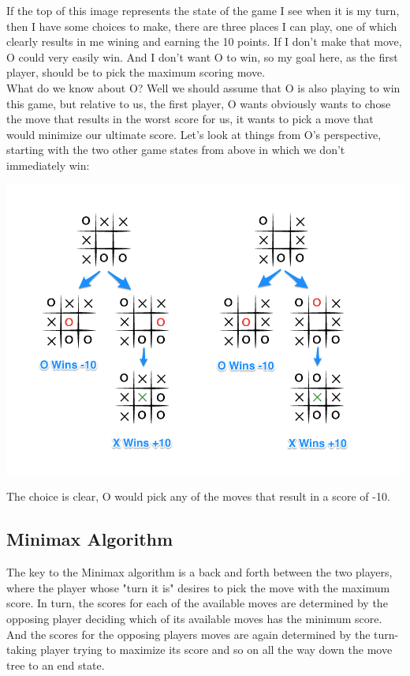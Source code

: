 If the top of this image represents the state of the game I see when it is my turn, then I have some choices to make, there are three places I can play, one of which clearly results in me wining and earning the 10 points. If I don't make that move, O could very easily win. And I don't want O to win, so my goal here, as the first player, should be to pick the maximum scoring move. \\

What do we know about O? Well we should assume that O is also playing to win this game, but relative to us, the first player, O wants obviously wants to chose the move that results in the worst score for us, it wants to pick a move that would minimize our ultimate score. Let's look at things from O's perspective, starting with the two other game states from above in which we don't immediately win: \\

\begin{center}
\includegraphics[width=1.1\textwidth]{./a-move-tree-from-the-perspective-of-the-other-player-o}
\end{center}

The choice is clear, O would pick any of the moves that result in a score of -10.

\subsection{Minimax Algorithm}

The key to the Minimax algorithm is a back and forth between the two players, where the player whose "turn it is" desires to pick the move with the maximum score. In turn, the scores for each of the available moves are determined by the opposing player deciding which of its available moves has the minimum score. And the scores for the opposing players moves are again determined by the turn-taking player trying to maximize its score and so on all the way down the move tree to an end state. \\

